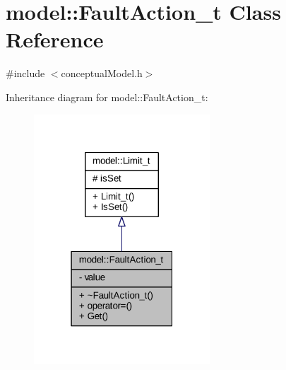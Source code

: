 \hypertarget{classmodel_1_1_fault_action__t}{}\section{model\+:\+:Fault\+Action\+\_\+t Class Reference}
\label{classmodel_1_1_fault_action__t}


{\ttfamily \#include $<$conceptual\+Model.\+h$>$}



Inheritance diagram for model\+:\+:Fault\+Action\+\_\+t\+:
\nopagebreak
\begin{figure}[H]
\begin{center}
\leavevmode
\includegraphics[width=187pt]{classmodel_1_1_fault_action__t__inherit__graph}
\end{center}
\end{figure}



